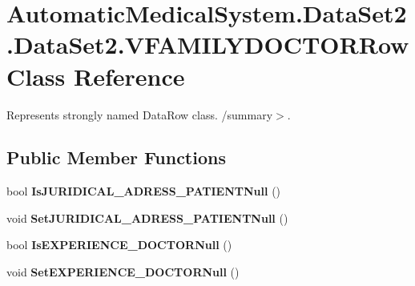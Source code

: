 \section{AutomaticMedicalSystem.DataSet2.DataSet2.VFAMILYDOCTORRow Class Reference}
\label{class_automatic_medical_system_1_1_data_set2_1_1_v_f_a_m_i_l_y_d_o_c_t_o_r_row}
Represents strongly named DataRow class. /summary$>$.  


\subsection*{Public Member Functions}
\begin{CompactItemize}
\item 
bool \textbf{IsJURIDICAL\_\-ADRESS\_\-PATIENTNull} ()\label{class_automatic_medical_system_1_1_data_set2_1_1_v_f_a_m_i_l_y_d_o_c_t_o_r_row_7d7998a02e33f268c4915b5709de98ea}

\item 
void \textbf{SetJURIDICAL\_\-ADRESS\_\-PATIENTNull} ()\label{class_automatic_medical_system_1_1_data_set2_1_1_v_f_a_m_i_l_y_d_o_c_t_o_r_row_ded7e69f1646ae6412a0d0792178f053}

\item 
bool \textbf{IsEXPERIENCE\_\-DOCTORNull} ()\label{class_automatic_medical_system_1_1_data_set2_1_1_v_f_a_m_i_l_y_d_o_c_t_o_r_row_59247aedfc99f68acf4ce5b6d8468a53}

\item 
void \textbf{SetEXPERIENCE\_\-DOCTORNull} ()\label{class_automatic_medical_system_1_1_data_set2_1_1_v_f_a_m_i_l_y_d_o_c_t_o_r_row_4db38ab09805dac693882b9a13f72faa}

\end{CompactItemize}
